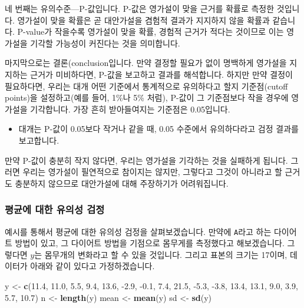 \documentclass[]{book}
\newenvironment{Shaded}{\begin{snugshade}}{\end{snugshade}}
\newcommand{\FloatTok}[1]{\textcolor[rgb]{0.00,0.00,0.81}{#1}}
\newcommand{\KeywordTok}[1]{\textcolor[rgb]{0.13,0.29,0.53}{\textbf{#1}}}
\newcommand{\NormalTok}[1]{#1}
\newcommand{\StringTok}[1]{\textcolor[rgb]{0.31,0.60,0.02}{#1}}
\providecommand{\tightlist}{%
  \setlength{\itemsep}{0pt}\setlength{\parskip}{0pt}}
\begin{document}
네 번째는 유의수준---P-값입니다. P-값은 영가설이 맞을 근거를 확률로 측정한 것입니다. 영가설이 맞을 확률은 곧 대안가설을 겸험적 결과가 지지하지 않을 확률과 같습니다. P-value가 작을수록 영가설이 맞을 확률, 경험적 근거가 적다는 것이므로 이는 영가설을 기각할 가능성이 커진다는 것을 의미합니다.

마지막으로는 결론(conclusion입니다. 만약 결정할 필요가 없이 명백하게 영가설을 지지하는 근거가 미비하다면, P-값을 보고하고 결과를 해석합니다. 하지만 만약 결정이 필요하다면, 우리는 대개 어떤 기준에서 통계적으로 유의하다고 할지 기준점(cutoff points)을 설정하고(예를 들어, 1\%나 5\% 처럼), P-값이 그 기준점보다 작을 경우에 영가설을 기각합니다. 가장 흔히 받아들여지는 기준점은 0.05입니다.

\begin{itemize}
\tightlist
\item
  대개는 P-값이 0.05보다 작거나 같을 때, 0.05 수준에서 유의하다라고 검정 결과를 보고합니다.
\end{itemize}

만약 P-값이 충분히 작지 않다면, 우리는 영가설을 기각하는 것을 실패하게 됩니다. 그러면 우리는 영가설이 필연적으로 참이지는 않지만, 그렇다고 그것이 아니라고 할 근거도 충분하지 않으므로 대안가설에 대해 주장하기가 어려워집니다.

\hypertarget{uxd3c9uxade0uxc5d0-uxb300uxd55c-uxc720uxc758uxc131-uxac80uxc815}{%
\subsubsection{평균에 대한 유의성 검정}\label{uxd3c9uxade0uxc5d0-uxb300uxd55c-uxc720uxc758uxc131-uxac80uxc815}}

예시를 통해서 평균에 대한 유의성 검정을 살펴보겠습니다. 만약에 \texttt{A}라고 하는 다이어트 방법이 있고, 그 다이어트 방법을 기점으로 몸무게를 측정했다고 해보겠습니다. 그렇다면 \(y\)는 몸무개의 변화라고 할 수 있을 것입니다. 그리고 표본의 크기는 17이며, 데이터가 아래와 같이 있다고 가정하겠습니다.

\begin{Shaded}
\begin{Highlighting}[]
\NormalTok{y <-}\StringTok{ }\KeywordTok{c}\NormalTok{(}\FloatTok{11.4}\NormalTok{, }\FloatTok{11.0}\NormalTok{, }\FloatTok{5.5}\NormalTok{, }\FloatTok{9.4}\NormalTok{, }\FloatTok{13.6}\NormalTok{, }\FloatTok{-2.9}\NormalTok{, }\FloatTok{-0.1}\NormalTok{, }\FloatTok{7.4}\NormalTok{, }\FloatTok{21.5}\NormalTok{, }
       \FloatTok{-5.3}\NormalTok{, }\FloatTok{-3.8}\NormalTok{, }\FloatTok{13.4}\NormalTok{, }\FloatTok{13.1}\NormalTok{, }\FloatTok{9.0}\NormalTok{, }\FloatTok{3.9}\NormalTok{, }\FloatTok{5.7}\NormalTok{, }\FloatTok{10.7}\NormalTok{)}
\NormalTok{n <-}\StringTok{ }\KeywordTok{length}\NormalTok{(y)}
\NormalTok{mean <-}\StringTok{ }\KeywordTok{mean}\NormalTok{(y)}
\NormalTok{sd <-}\StringTok{ }\KeywordTok{sd}\NormalTok{(y)}
\end{Highlighting}
\end{Shaded}
\end{document}
